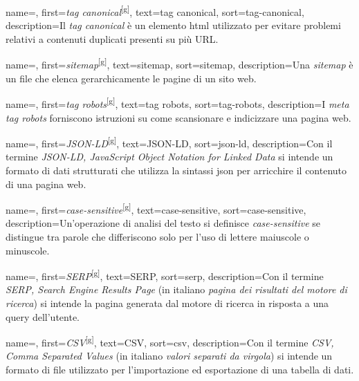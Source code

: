  {
    name=,
    first={\textit{tag canonical}\textsuperscript{[g]}},
    text=tag canonical,
    sort=tag-canonical,
    description={Il \textit{tag canonical} è un elemento \gls{html} utilizzato per evitare problemi relativi a contenuti duplicati presenti su più URL.}
}

 {
    name=,
    first={\textit{sitemap}\textsuperscript{[g]}},
    text=sitemap,
    sort=sitemap,
    description={Una \textit{sitemap} è un file che elenca gerarchicamente le pagine di un sito web.}
}

 {
    name=,
    first={\textit{tag robots}\textsuperscript{[g]}},
    text=tag robots,
    sort=tag-robots,
    description={I \textit{meta tag robots} forniscono istruzioni su come scansionare e indicizzare una pagina web.}
}

 {
    name=,
    first={\textit{JSON-LD}\textsuperscript{[g]}},
    text=JSON-LD,
    sort=json-ld,
    description={Con il termine \textit{JSON-LD, JavaScript Object Notation for Linked Data} si intende un formato di dati strutturati che utilizza la sintassi \gls{json} per arricchire il contenuto di una pagina web.}
}

 {
    name=,
    first={\textit{case-sensitive}\textsuperscript{[g]}},
    text=case-sensitive,
    sort=case-sensitive,
    description={Un'operazione di analisi del testo si definisce \textit{case-sensitive} se distingue tra parole che differiscono solo per l'uso di lettere maiuscole o minuscole.}
}

 {
    name=,
    first={\textit{SERP}\textsuperscript{[g]}},
    text=SERP,
    sort=serp,
    description={Con il termine \textit{SERP, Search Engine Results Page} (in italiano \textit{pagina dei risultati del motore di ricerca}) si intende la pagina generata dal motore di ricerca in risposta a una query dell'utente.}
}

 {
    name=,
    first={\textit{CSV}\textsuperscript{[g]}},
    text=CSV,
    sort=csv,
    description={Con il termine \textit{CSV, Comma Separated Values} (in italiano \textit{valori separati da virgola}) si intende un formato di file utilizzato per l'importazione ed esportazione di una tabella di dati.}
}

